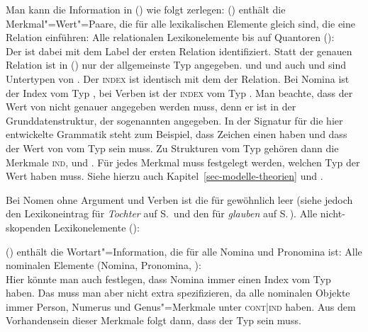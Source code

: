 Man kann die Information in () wie folgt zerlegen: () enthält 
die Merkmal"=Wert"=Paare, die für alle lexikalischen Elemente gleich sind, die eine Relation
einführen:
\ea
Alle relationalen Lexikonelemente bis auf Quantoren ():\\
\z
Der \ltopw ist dabei mit dem Label der ersten Relation identifiziert. Statt der genauen Relation ist
in () nur der allgemeinste Typ angegeben.  und  und auch 
und  sind Untertypen von .
Der \textsc{index} ist
identisch mit dem \argzero der Relation. Bei Nomina ist der Index vom Typ , bei Verben ist der
\textsc{index} vom Typ . Man beachte, dass der Wert von \ltop nicht genauer angegeben
werden muss, denn er ist in der Grunddatenstruktur, der sogenannten  angegeben. In
der Signatur für die hier entwickelte Grammatik steht zum Beispiel, dass Zeichen einen \contw haben
und dass der Wert von \cont vom Typ  sein muss. Zu Strukturen vom Typ  gehören
dann die Merkmale \ltop \textsc{ind}, \rels und \hcons. Für jedes Merkmal muss festgelegt werden,
welchen Typ der Wert haben muss. Siehe hierzu auch Kapitel~\ref{sec-modelle-theorien} und .

Bei Nomen ohne Argument und Verben ist die \hconsl für
gewöhnlich leer (siehe jedoch den Lexikoneintrag für \emph{Tochter} auf S.\,\pageref{le-Tochter} und den für \emph{glauben} auf S.\,\pageref{le-glauben}).
\ea
Alle nicht-skopenden Lexikonelemente ():\\
\z

() enthält die Wortart"=Information, die für alle Nomina und Pronomina  ist:
\ea
Alle nominalen Elemente (Nomina, Pronomina, ):\\
\z
Hier könnte man auch festlegen, dass Nomina immer einen Index vom Typ  haben. Das muss
man aber nicht extra spezifizieren, da alle nominalen Objekte immer Person, Numerus und
Genus"=Merkmale unter \textsc{cont|ind} haben. Aus dem Vorhandensein dieser Merkmale folgt dann,
dass der Typ  sein muss.

